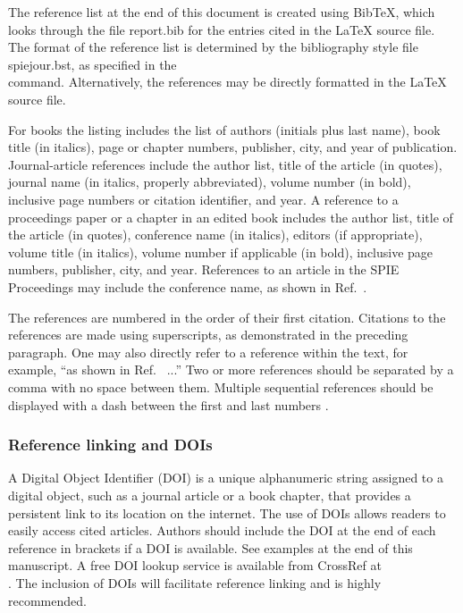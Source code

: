 \documentclass[12pt]{spieman}  %
\begin{document}
\begin{spacing}{2}
The reference list at the end of this document is created using BibTeX, which looks through the file {\ttfamily report.bib} for the entries cited in the LaTeX source file.  The format of the reference list is determined by the bibliography style file {\ttfamily spiejour.bst}, as specified in the \\ \verb|| command.  Alternatively, the references may be directly formatted in the LaTeX source file.

For books\cite{Lamport94,Alred03,Goossens97} the listing includes the list of authors (initials plus last name), book title (in italics), page or chapter numbers, publisher, city, and year of publication.  Journal-article references \cite{Metropolis53,Harris06} include the author list, title of the article (in quotes), journal name (in italics, properly abbreviated), volume number (in bold), inclusive page numbers or citation identifier, and year.  A reference to a proceedings paper or a chapter in an edited book\cite{Gull89a} includes the author list, title of the article (in quotes), conference name (in italics), editors (if appropriate), volume title (in italics), volume number if applicable (in bold), inclusive page numbers, publisher, city, and year.  References to an article in the SPIE Proceedings may include the conference name, as shown in Ref.~.

The references are numbered in the order of their first citation. Citations to the references are made using superscripts, as demonstrated in the preceding paragraph. One may also directly refer to a reference within the text, for example, ``as shown in Ref.~ ...''  Two or more references should be separated by a comma with no space between them. Multiple sequential references should be displayed with a dash between the first and last numbers \cite{Alred03,Perelman97,Lamport94,Goossens97,Metropolis53}. 

\subsubsection{Reference linking and DOIs}
A Digital Object Identifier (DOI) is a unique alphanumeric string assigned to a digital object, such as a journal article or a book chapter, that provides a persistent link to its location on the internet. The use of DOIs allows readers to easily access cited articles. Authors should include the DOI at the end of each reference in brackets if a DOI is available. See examples at the end of this manuscript. A free DOI lookup service is available from CrossRef at \\. The inclusion of DOIs will facilitate reference linking and is highly recommended. 


\end{spacing}
\end{document}
